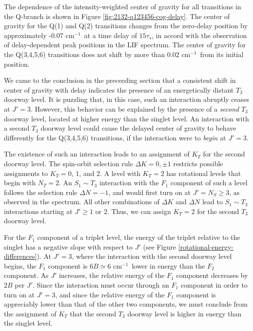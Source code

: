 \documentclass[12pt]{mitthesis}
\newcommand{\rcm}{cm$^{-1}$}
\begin{document}
The dependence of the intensity-weighted center of gravity for all
transitions in the Q-branch is shown in Figure
\ref{fig:2132-q123456-cog-delay}.  The center of gravity for the Q(1)
and Q(2) transitions changes from the zero-delay position by
approximately -0.07 \rcm\ at a time delay of $15\tau_s$, in accord
with the observation of delay-dependent peak positions in the LIF
spectrum.  The center of gravity for the Q(3,4,5,6) transitions does
not shift by more than 0.02 \rcm\ from its initial position.

We came to the conclusion in the preceeding section that a consistent
shift in center of gravity with delay indicates the presence of an
energetically distant $T_3$ doorway level.  It is puzzling that, in
this case, such an interaction abruptly ceases at $J'=3$.  However,
this behavior can be explained by the presence of a \emph{second}
$T_3$ doorway level, located at higher energy than the singlet level.
An interaction with a second $T_3$ doorway level could cause the
delayed center of gravity to behave differently for the Q(3,4,5,6)
transitions, if the interaction were to \emph{begin} at $J'=3$.

The existence of such an interaction leads to an assignment of $K_T$
for the second doorway level.  The spin-orbit selection rule $\Delta K
= 0, \pm 1$ restricts possible assignments to $K_T=$0, 1, and 2.  A
level with $K_T=2$ has rotational levels that begin with $N_T=2$.  An
$S_1 \sim T_3$ interaction with the $F_1$ component of such a level
follows the selection rule $\Delta N = -1$, and would first turn on at
$J'=N_S \geq 3$, as observed in the spectrum.  All other combinations
of $\Delta K$ and $\Delta N$ lead to $S_1 \sim T_3$ interactions
starting at $J' \geq 1$ or $2$.  Thus, we can assign $K_T=2$ for the
second $T_3$ doorway level.

For the $F_1$ component of a triplet level, the energy of the triplet
relative to the singlet has a negative slope with respect to $J'$ (see
Figure \ref{rotational-energy-differences}).  At $J'=3$, where the
interaction with the second doorway level begins, the $F_1$ component
is $6B \simeq 6$ \rcm\ lower in energy than the $F_2$ component.  As
$J'$ increases, the relative energy of the $F_1$ component decreases
by $2B$ per $J'$.  Since the interaction must occur through an $F_1$
component in order to turn on at $J'=3$, and since the relative energy
of the $F_1$ component is appreciably lower than that of the other two
components, we must conclude from the assignment of $K_T$ that the
second $T_3$ doorway level is higher in energy than the singlet level.
\end{document}
